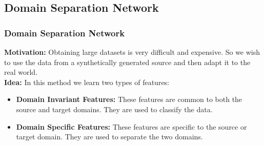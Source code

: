 \documentclass{beamer}
\begin{document}

    



\subsection{Domain Separation Network}
\begin{frame}
    \frametitle{Domain Separation Network}
    \textbf{Motivation:} Obtaining large datasets is very difficult and expensive. So we wish to use the data from a synthetically generated source and then adapt it to the real world.\\
    \textbf{Idea:} In this method we learn two types of features:
    \begin{itemize}
        \item \textbf{Domain Invariant Features:} These features are common to both the source and target domains. They are used to classify the data.
        \item \textbf{Domain Specific Features:} These features are specific to the source or target domain. They are used to separate the two domains.
    \end{itemize}
\end{frame}
\end{document}
